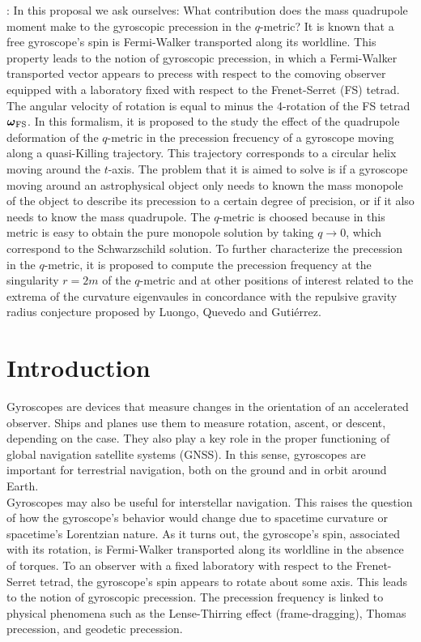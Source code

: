 \documentclass[12pt]{article}
\begin{document}
: 
\noindent In this proposal we ask ourselves: What contribution does the mass quadrupole moment make to the gyroscopic precession in the $q$-metric? It is known that a free gyroscope's spin is Fermi-Walker transported along its worldline. This property leads to the notion of gyroscopic precession, in which a Fermi-Walker transported vector appears to precess with respect to the comoving observer equipped with a laboratory fixed with respect to the Frenet-Serret (FS) tetrad. The angular velocity of rotation is equal to minus the 4-rotation of the FS tetrad $\boldsymbol{\omega}_{\rm FS}$. In this formalism, it is proposed to the study the effect of the quadrupole deformation of the $q$-metric in the precession frecuency of a gyroscope moving along a quasi-Killing trajectory. This trajectory corresponds to a circular helix moving around the $t$-axis. The problem that it is aimed to solve is if a gyroscope moving around an astrophysical object only needs to known the mass monopole of the object to describe its precession to a certain degree of precision, or if it also needs to know the mass quadrupole. The $q$-metric is choosed because in this metric is easy to obtain the pure monopole solution by taking $q\to 0$, which correspond to the Schwarzschild solution. To further characterize the precession in the $q$-metric, it is proposed to compute the precession frequency at the singularity $r=2m$ of the $q$-metric and at other positions of interest related to the extrema of the curvature eigenvaules in concordance with the repulsive gravity radius conjecture proposed by Luongo, Quevedo and Gutiérrez.
\newpage

\tableofcontents
\newpage

\section{Introduction}

Gyroscopes are devices that measure changes in the orientation of an accelerated observer. Ships and planes use them to measure rotation, ascent, or descent, depending on the case. They also play a key role in the proper functioning of global navigation satellite systems (GNSS). In this sense, gyroscopes are important for terrestrial navigation, both on the ground and in orbit around Earth. \\

Gyroscopes may also be useful for interstellar navigation. This raises the question of how the gyroscope's behavior would change due to spacetime curvature or spacetime's Lorentzian nature. As it turns out, the gyroscope's spin, associated with its rotation, is Fermi-Walker transported along its worldline in the absence of torques. To an observer with a fixed laboratory with respect to the Frenet-Serret tetrad, the gyroscope’s spin appears to rotate about some axis. This leads to the notion of gyroscopic precession. The precession frequency is linked to physical phenomena such as the Lense-Thirring effect (frame-dragging), Thomas precession, and geodetic precession.\\
\end{document}
